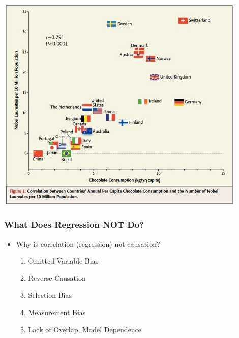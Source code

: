 \documentclass[xcolor=x11names,compress]{beamer}\usepackage[]{graphicx}\usepackage[]{color}
\renewcommand{\(}{\begin{columns}}
\renewcommand{\)}{\end{columns}}
\newcommand{\<}[1]{\begin{column}{#1}}
\renewcommand{\>}{\end{column}}
\begin{document}
\includegraphics[width=0.9\textwidth]{Chocolate_Nobel.jpg}









\begin{frame}
\frametitle{What Does Regression NOT Do?}
\begin{itemize}
\item Why is correlation (regression) not causation?
\begin{enumerate}
\item Omitted Variable Bias
\item Reverse Causation
\item Selection Bias
\item Measurement Bias
\item Lack of Overlap, Model Dependence
\end{enumerate}
\end{itemize}
\end{frame}
\end{document}
